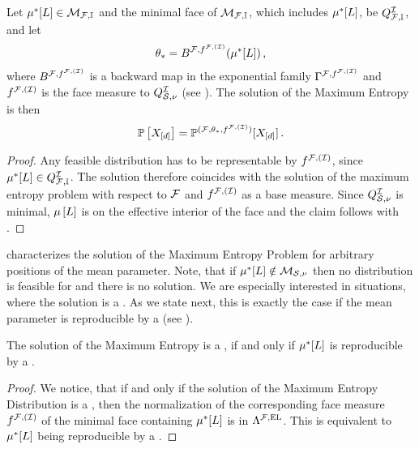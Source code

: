 \begin{theorem}
    \label{the:maxEntropyCharacterizationHLN}
    Let $\mu^*[L]\in\mathcal{M}_{\mathcal{F},\mathbb{I}}$ and the minimal face of $\mathcal{M}_{\mathcal{F},\mathbb{I}}$, which includes $\mu^*[L]$, be $Q^{\mathcal{I}}_{\mathcal{F},\mathbb{I}}$, and let
    \begin{align*}
        \theta_{*} = B^{\mathcal{F},f^{\mathcal{F},(\mathcal{I})}}(\mu^*[L]) \, ,
    \end{align*}
    where $B^{\mathcal{F},f^{\mathcal{F},(\mathcal{I})}}$ is a backward map in the exponential family $\Gamma^{\mathcal{F},f^{\mathcal{F},(\mathcal{I})}}$ and $f^{\mathcal{F},(\mathcal{I})}$ is the face measure to $Q^{\mathcal{I}}_{\mathcal{S},\nu}$ (see ).
    The solution of the Maximum Entropy  is then
    \begin{align*}
        \mathbb{P}\left[X_{[d]}\right] = \mathbb{P}^{(\mathcal{F},\theta_{*},f^{\mathcal{F},(\mathcal{I})})}[X_{[d]}] \, .
    \end{align*}
\end{theorem}
\begin{proof}
    Any feasible distribution has to be representable by $f^{\mathcal{F},(\mathcal{I})}$, since $\mu^*[L]\in Q^{\mathcal{I}}_{\mathcal{F},\mathbb{I}}$.
    The solution therefore coincides with the solution of the maximum entropy problem with respect to $\mathcal{F}$ and $f^{\mathcal{F},(\mathcal{I})}$ as a base measure.
    Since $Q^{\mathcal{I}}_{\mathcal{S},\nu}$ is minimal, $\mu\left[L\right]$ is on the effective interior of the face and the claim follows with .
\end{proof}

 characterizes the solution of the Maximum Entropy Problem for arbitrary positions of the mean parameter.
Note, that if $\mu^*[L]\notin\mathcal{M}_{\mathcal{S},\nu}$ then no distribution is feasible for  and there is no solution.
We are especially interested in situations, where the solution is a \HybridLogicNetwork{}.
As we state next, this is exactly the case if the mean parameter is reproducible by a \HybridLogicNetwork{} (see ).

\begin{theorem}
    The solution of the Maximum Entropy  is a \HybridLogicNetwork{}, if and only if $\mu^*[L]$ is reproducible by a \HybridLogicNetwork{}.
\end{theorem}
\begin{proof}
    We notice, that if and only if the solution of the Maximum Entropy Distribution is a \HybridLogicNetwork{}, then the normalization of the corresponding face measure $f^{\mathcal{F},(\mathcal{I})}$ of the minimal face containing $\mu^*[L]$ is in $\Lambda^{\mathcal{F},\mathrm{EL}}$.
    This is equivalent to $\mu^*[L]$ being reproducible by a \HybridLogicNetwork{}.
\end{proof}


